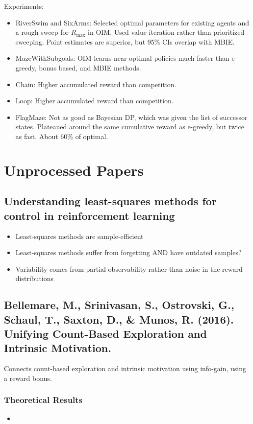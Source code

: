 \documentclass[12pt, oneside]{amsart}
\begin{document}
	Experiments:
	\begin{itemize}
		\item RiverSwim and SixArms: Selected optimal parameters for existing agents and a rough sweep for $R_{\text{max}}$ in OIM. Used value iteration rather than prioritized sweeping. Point estimates are superior, but 95\% CIs overlap with MBIE.
		\item MazeWithSubgoals: OIM learns near-optimal policies much faster than e-greedy, bonus based, and MBIE methods.
		\item Chain: Higher accumulated reward than competition.
		\item Loop: Higher accumulated reward than competition.
		\item FlagMaze: Not as good as Bayesian DP, which was given the list of successor states. Plateaued around the same cumulative reward as e-greedy, but twice as fast. About 60\% of optimal.
	\end{itemize}
	
	\section*{Unprocessed Papers}
	\subsection*{Understanding least-squares methods for control in reinforcement learning}
	
	\begin{itemize}
		\item Least-squares methods are sample-efficient
		\item Least-squares methods suffer from forgetting AND have outdated samples?
		\item Variability comes from partial observability rather than noise in the reward distributions
	\end{itemize}
	
	\subsection*{Bellemare, M., Srinivasan, S., Ostrovski, G., Schaul, T., Saxton, D., \& Munos, R. (2016). Unifying Count-Based Exploration and Intrinsic Motivation.}
	Connects count-based exploration and intrinsic motivation using info-gain, using a reward bonus.
	
	\subsubsection*{Theoretical Results}
	\begin{itemize}
		\item 
	\end{itemize}
	
\end{document}
